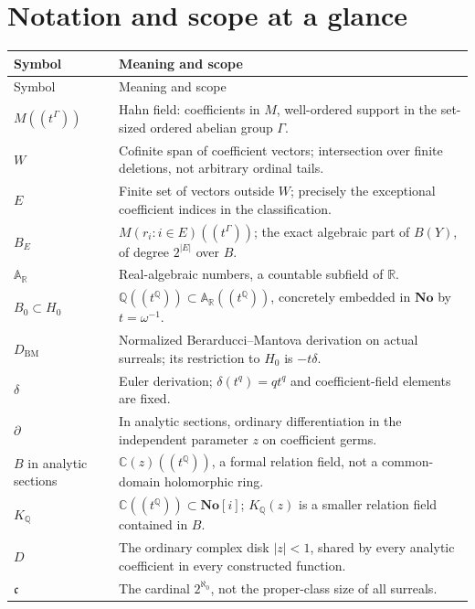 \documentclass[11pt,a4paper]{article}
\numberwithin{equation}{section}
\theoremstyle{definition}
\theoremstyle{remark}
\newcommand{\No}{\mathbf{No}}
\newcommand{\R}{\mathbb R}
\newcommand{\C}{\mathbb C}
\newcommand{\Q}{\mathbb Q}
\newcommand{\AR}{\mathbb A_{\R}}
\newcommand{\BM}{D_{\mathrm{BM}}}
\newcommand{\EDer}{\delta}
\newcommand{\cf}{\mathfrak c}
\begin{document}
\section{Notation and scope at a glance}
\small
\begin{longtable}{@{}p{}p{}@{}}
\toprule
Symbol & Meaning and scope\\
\midrule
\endfirsthead
\toprule Symbol & Meaning and scope\\\midrule
\endhead
$M((t^\Gamma))$ & Hahn field: coefficients in $M$, well-ordered support in the set-sized ordered abelian group $\Gamma$.\\
$W$ & Cofinite span of coefficient vectors; intersection over finite deletions, not arbitrary ordinal tails.\\
$E$ & Finite set of vectors outside $W$; precisely the exceptional coefficient indices in the classification.\\
$B_E$ & $M(r_i:i\in E)((t^\Gamma))$; the exact algebraic part of $B(Y)$, of degree $2^{|E|}$ over $B$.\\
$\AR$ & Real-algebraic numbers, a countable subfield of $\R$.\\
$B_0\subset H_0$ & $\Q((t^\Q))\subset\AR((t^\Q))$, concretely embedded in $\No$ by $t=\omega^{-1}$.\\
$\BM$ & Normalized Berarducci--Mantova derivation on actual surreals; its restriction to $H_0$ is $-t\EDer$.\\
$\EDer$ & Euler derivation; $\EDer(t^q)=qt^q$ and coefficient-field elements are fixed.\\
$\partial$ & In analytic sections, ordinary differentiation in the independent parameter $z$ on coefficient germs.\\
$B$ in analytic sections & $\C(z)((t^\Q))$, a formal relation field, not a common-domain holomorphic ring.\\
$K_\Q$ & $\C((t^\Q))\subset\No[i]$; $K_\Q(z)$ is a smaller relation field contained in $B$.\\
$D$ & The ordinary complex disk $|z|<1$, shared by every analytic coefficient in every constructed function.\\
$\cf$ & The cardinal $2^{\aleph_0}$, not the proper-class size of all surreals.\\
\bottomrule
\end{longtable}
\normalsize
\end{document}

